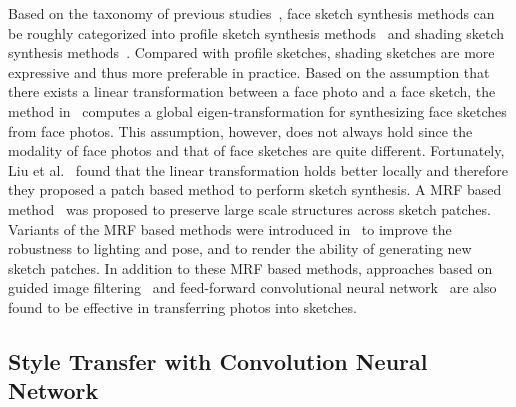 \documentclass[10pt,twocolumn,letterpaper]{article}
\begin{document}
Based on the taxonomy of previous studies~\cite{song2014real,zhou2012markov}, face sketch synthesis methods can be roughly categorized into profile sketch synthesis methods~\cite{berger2013style,chen2001example,xu2008hierarchical} and shading sketch synthesis methods~\cite{liu2005nonlinear,song2014real,tang2003face,wang2009face,zhang2015end,zhang2010lighting,zhou2012markov}. Compared with profile sketches, shading sketches are more expressive and thus more preferable in practice. Based on the assumption that there exists a linear transformation between a face photo and a face sketch, the method in~\cite{tang2003face} computes a global eigen-transformation for synthesizing face sketches from face photos. This assumption, however, does not always hold since the modality of face photos and that of face sketches are quite different. Fortunately, Liu et al.~\cite{liu2005nonlinear} found that the linear transformation holds better locally and therefore they proposed a patch based method to perform sketch synthesis. A MRF based method~\cite{wang2009face} was proposed to preserve large scale structures across sketch patches. Variants of the MRF based methods were introduced in~\cite{zhang2010lighting,zhou2012markov} to improve the robustness to lighting and pose, and to render the ability of generating new sketch patches. In addition to these MRF based methods, approaches based on guided image filtering~\cite{song2014real} and feed-forward convolutional neural network~\cite{zhang2015end} are also found to be effective in transferring photos into sketches.

\subsection{Style Transfer with Convolution Neural Network}
\end{document}
